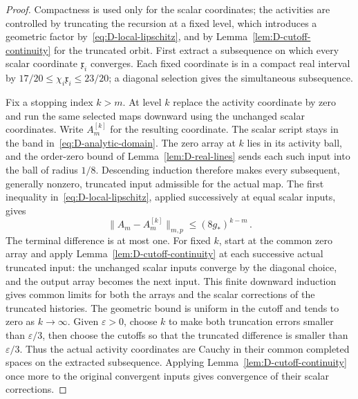 \begin{proof}
Compactness is used only for the scalar coordinates; the activities are controlled by truncating the recursion at a fixed level, which introduces a geometric factor by~\eqref{eq:D-local-lipschitz}, and by Lemma~\ref{lem:D-cutoff-continuity} for the truncated orbit. First extract a subsequence on which every scalar coordinate $\mathfrak x_i$ converges. Each fixed coordinate is in a compact real interval by $17/20\le\chi_i \mathfrak x_i\le23/20$; a diagonal selection gives the simultaneous subsequence.

Fix a stopping index $k>m$. At level $k$ replace the activity coordinate by zero and run the same selected maps downward using the unchanged scalar coordinates. Write $A_m^{[k]}$ for the resulting coordinate. The scalar script stays in the band in~\eqref{eq:D-analytic-domain}. The zero array at $k$ lies in its activity ball, and the order-zero bound of Lemma~\ref{lem:D-real-lines} sends each such input into the ball of radius $1/8$. Descending induction therefore makes every subsequent, generally nonzero, truncated input admissible for the actual map. The first inequality in~\eqref{eq:D-local-lipschitz}, applied successively at equal scalar inputs, gives
\begin{equation}\label{eq:D-truncated-orbit}
\|A_m-A_m^{[k]}\|_{m,p}\le(8g_*)^{k-m}\,.
\end{equation}
The terminal difference is at most one. For fixed $k$, start at the common zero array and apply Lemma~\ref{lem:D-cutoff-continuity} at each successive actual truncated input: the unchanged scalar inputs converge by the diagonal choice, and the output array becomes the next input. This finite downward induction gives common limits for both the arrays and the scalar corrections of the truncated histories. The geometric bound is uniform in the cutoff and tends to zero as $k\to\infty$. Given $\varepsilon>0$, choose $k$ to make both truncation errors smaller than $\varepsilon/3$, then choose the cutoffs so that the truncated difference is smaller than $\varepsilon/3$. Thus the actual activity coordinates are Cauchy in their common completed spaces on the extracted subsequence. Applying Lemma~\ref{lem:D-cutoff-continuity} once more to the original convergent inputs gives convergence of their scalar corrections.


\end{proof}
